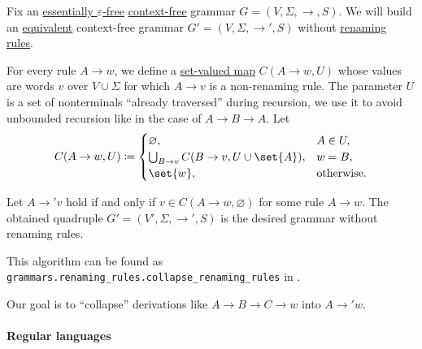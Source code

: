 \begin{algorithm}\label{alg:renaming_rule_collapse}
  Fix an \hyperref[def:epsilon_free_grammar]{essentially \( \varepsilon \)-free} \hyperref[def:chomsky_hierarchy/context_free]{context-free} grammar \( G = (V, \Sigma, \to, S) \). We will build an \hyperref[def:formal_grammar/equivalent]{equivalent} context-free grammar \( G' = (V, \Sigma, \to', S) \) without \hyperref[def:renaming_rule]{renaming rules}.

  \begin{thmenum}
     For every rule \( A \to w \), we define a \hyperref[def:function]{set-valued map} \( C(A \to w, U) \) whose values are words \( v \) over \( V \cup \Sigma \) for which \( A \to v \) is a non-renaming rule. The parameter \( U \) is a set of nonterminals \enquote{already traversed} during recursion, we use it to avoid unbounded recursion like in the case of \( A \to B \to A \). Let
    \begin{equation*}
      C(A \to w, U) \coloneqq \begin{cases}
        \varnothing,                                    &A \in U, \\
        \bigcup_{B \to v} C(B \to v, U \cup \set{ A }), &w = B, \\
        \set{ w },                                      &\T{otherwise.}
      \end{cases}
    \end{equation*}

     Let \( A \to' v \) hold if and only if \( v \in C(A \to w, \varnothing) \) for some rule \( A \to w \). The obtained quadruple \( G' = (V', \Sigma, \to', S) \) is the desired grammar without renaming rules.
  \end{thmenum}
\end{algorithm}
\begin{comments}
  \item This algorithm can be found as \texttt{grammars.renaming\_rules.collapse\_renaming\_rules} in \cite{code}.
  \item Our goal is to \enquote{collapse} derivations like \( A \to B \to C \to w \) into \( A \to' w \).
\end{comments}

\paragraph{Regular languages}

